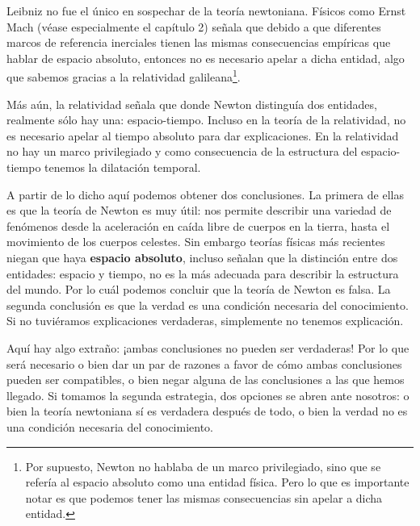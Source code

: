 \documentclass[12pt]{article}
\begin{document}
Leibniz no fue el único en sospechar de la teoría newtoniana. Físicos como Ernst Mach (véase especialmente el capítulo 2) \citeyear{Mach2013} señala que debido a que diferentes marcos de referencia inerciales tienen las mismas consecuencias empíricas que hablar de espacio absoluto, entonces no es necesario apelar a dicha entidad, algo que sabemos gracias a la relatividad galileana\footnote{Por supuesto, Newton no hablaba de un marco privilegiado, sino que se refería al espacio absoluto como una entidad física. Pero lo que es importante notar es que podemos tener las mismas consecuencias sin apelar a dicha entidad.}.

Más aún, la relatividad señala que donde Newton distinguía dos entidades, realmente sólo hay una: espacio-tiempo. Incluso en la teoría de la relatividad, no es necesario apelar al tiempo absoluto para dar explicaciones. En la relatividad no hay un marco privilegiado y como consecuencia de la estructura del espacio-tiempo tenemos la dilatación temporal.

A partir de lo dicho aquí podemos obtener dos conclusiones. La primera de ellas es que la teoría de Newton es muy útil: nos permite describir una variedad de fenómenos desde la aceleración en caída libre de cuerpos en la tierra, hasta el movimiento de los cuerpos celestes. Sin embargo teorías físicas más recientes niegan que haya \textbf{espacio absoluto}, incluso señalan que la distinción entre dos entidades: espacio y tiempo, no es la más adecuada para describir la estructura del mundo. Por lo cuál podemos concluir que la teoría de Newton es falsa. La segunda conclusión es que la verdad es una condición necesaria del conocimiento. Si no tuviéramos explicaciones verdaderas, simplemente no tenemos explicación. 

Aquí hay algo extraño: ¡ambas conclusiones no pueden ser verdaderas! Por lo que será necesario o bien dar un par de razones a favor de cómo ambas conclusiones pueden ser compatibles, o bien negar alguna de las conclusiones a las que hemos llegado. Si tomamos la segunda estrategia, dos opciones se abren ante nosotros: o bien la teoría newtoniana sí es verdadera después de todo, o bien la verdad no es una condición necesaria del conocimiento.
\end{document}
